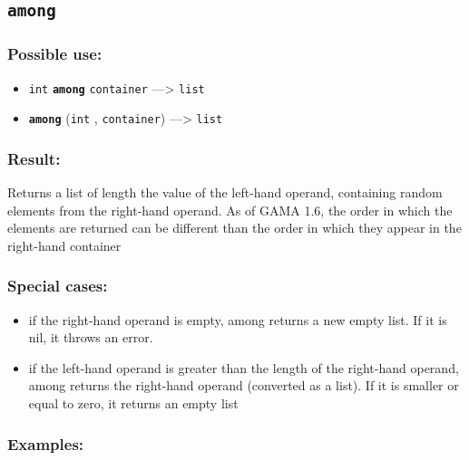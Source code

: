 \documentclass[]{book}
\providecommand{\tightlist}{%
  \setlength{\itemsep}{0pt}\setlength{\parskip}{0pt}}
\theoremstyle{definition}
\theoremstyle{definition}
\theoremstyle{definition}
\theoremstyle{remark}
\begin{document}
\subsection{\texorpdfstring{\texttt{among}}{among}}\label{among}

\subsubsection{Possible use:}\label{possible-use-34}

\begin{itemize}
\tightlist
\item
  \texttt{int} \textbf{\texttt{among}} \texttt{container}
  ---\textgreater{} \texttt{list}
\item
  \textbf{\texttt{among}} (\texttt{int} , \texttt{container})
  ---\textgreater{} \texttt{list}
\end{itemize}

\subsubsection{Result:}\label{result-33}

Returns a list of length the value of the left-hand operand, containing
random elements from the right-hand operand. As of GAMA 1.6, the order
in which the elements are returned can be different than the order in
which they appear in the right-hand container

\subsubsection{Special cases:}\label{special-cases-15}

\begin{itemize}
\tightlist
\item
  if the right-hand operand is empty, among returns a new empty list. If
  it is nil, it throws an error.\\
\item
  if the left-hand operand is greater than the length of the right-hand
  operand, among returns the right-hand operand (converted as a list).
  If it is smaller or equal to zero, it returns an empty list
\end{itemize}

\subsubsection{Examples:}\label{examples-27}
\end{document}
